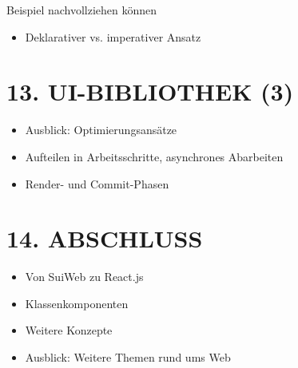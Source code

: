 Beispiel nachvollziehen können

\begin{itemize}
  \item Deklarativer vs. imperativer Ansatz
\end{itemize}

\section*{13. UI-BIBLIOTHEK (3)}
\begin{itemize}
  \item Ausblick: Optimierungsansätze
  \item Aufteilen in Arbeitsschritte, asynchrones Abarbeiten
  \item Render- und Commit-Phasen
\end{itemize}

\section*{14. ABSCHLUSS}
\begin{itemize}
  \item Von SuiWeb zu React.js
  \item Klassenkomponenten
  \item Weitere Konzepte
  \item Ausblick: Weitere Themen rund ums Web
\end{itemize}